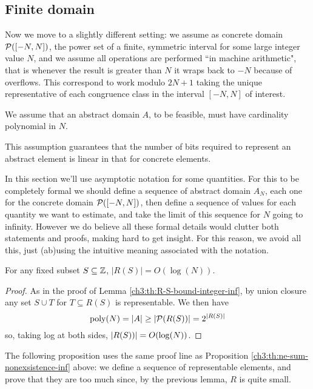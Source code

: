 \subsection{Finite domain}
Now we move to a slightly different setting: we assume as concrete domain $\mathcal{P}([-N, N])$, the power set of a finite, symmetric interval for some large integer value $N$, and we assume all operations are performed ``in machine arithmetic", that is whenever the result is greater than $N$ it wraps back to $-N$ because of overflows. This correspond to work modulo $2N + 1$ taking the unique representative of each congruence class in the interval $[-N, N]$ of interest.
\begin{assumption}
	We assume that an abstract domain $A$, to be feasible, must have cardinality polynomial in $N$.
\end{assumption}
This assumption guarantees that the number of bits required to represent an abstract element is linear in that for concrete elements.

In this section we'll use asymptotic notation for some quantities. For this to be completely formal we should define a sequence of abstract domain $A_N$, each one for the concrete domain $\mathcal{P}([-N, N])$, then define a sequence of values for each quantity we want to estimate, and take the limit of this sequence for $N$ going to infinity. However we do believe all these formal details would clutter both statements and proofs, making hard to get insight. For this reason, we avoid all this, just (ab)using the intuitive meaning associated with the notation.

\begin{lemma}\label{ch3:th:R-S-bound-integer-fin}
	For any fixed subset $S \subseteq \mathbb{Z}$, $\lvert R(S) \rvert = O(\log(N))$.
\end{lemma}
\begin{proof}
	As in the proof of Lemma \ref{ch3:th:R-S-bound-integer-inf}, by union closure any set $S \cup T$ for $T \subseteq R(S)$ is representable. We then have
	\[
	\text{poly}(N) = \lvert A\rvert \ge \lvert\mathcal{P}(R(S))\rvert = 2^{\lvert R(S)\rvert}
	\]
	so, taking log at both sides, $\lvert R(S))\rvert = O(\log(N))$.
\end{proof}

The following proposition uses the same proof line as Proposition \ref{ch3:th:ne-sum-nonexsistence-inf} above: we define a sequence of representable elements, and prove that they are too much since, by the previous lemma, $R$ is quite small.

